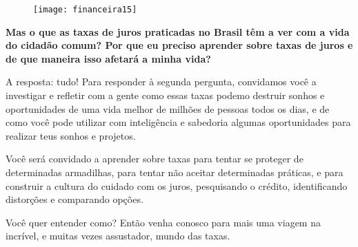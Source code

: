 \begin{figure}[H]
\centering

\texttt{[image: financeira15]}
\end{figure}


\textbf{Mas o que as taxas de juros praticadas no Brasil têm a ver com a vida do cidadão comum? Por que eu preciso aprender sobre taxas de juros e de que maneira isso afetará a minha vida?}

A resposta: tudo! Para responder à segunda pergunta, convidamos você a investigar e refletir com a gente como essas taxas podemo destruir sonhos e oportunidades de uma vida melhor de milhões de pessoas todos os dias, e de como você pode utilizar com inteligência e sabedoria algumas oportunidades para realizar teus sonhos e projetos.

Você será convidado a aprender sobre taxas para tentar se proteger de determinadas armadilhas, para tentar não aceitar determinadas práticas, e para construir a cultura do cuidado com os juros, pesquisando o crédito, identificando distorções e comparando opções.

Você quer entender como? Então venha conosco para mais uma viagem na incrível, e muitas vezes assustador, mundo das taxas.

